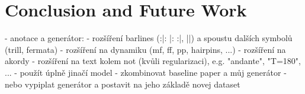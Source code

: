 \chapter{Conclusion and Future Work}
\label{chap:ConclusionAndFutureWork}

\begin{code}
- anotace a generátor:
  - rozšíření barlines (:|: |: :|, ||) a spoustu dalších symbolů (trill, fermata)
  - rozšíření na dynamiku (mf, ff, pp, hairpins, ...)
  - rozšíření na akordy
  - rozšíření na text kolem not (kvůli regularizaci), e.g. "andante", "T=180", ...
- použít úplně jinačí model - zkombinovat baseline paper a můj generátor
- nebo vypiplat generátor a postavit na jeho základě novej dataset
\end{code}
